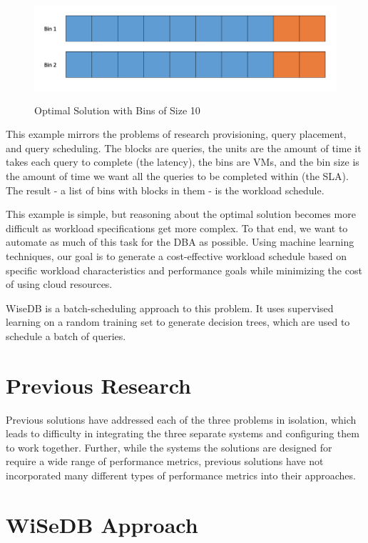 \documentclass{brandiss}
\numberwithin{section}{chapter}
\numberwithin{figure}{chapter}
\theoremstyle{definition}
\theoremstyle{plain}
\theoremstyle{remark}
\begin{document}
\begin{figure}[htbp]
  \centering
  \includegraphics[height=1.5in]{wisedb-example3}
  \caption{Optimal Solution with Bins of Size 10}
  \label{fig:wisedb-example3}
\end{figure}

This example mirrors the problems of research provisioning, query placement, and query scheduling. The blocks are queries, the units are the amount of time it takes each query to complete (the latency), the bins are VMs, and the bin size is the amount of time we want all the queries to be completed within (the SLA). The result - a list of bins with blocks in them - is the workload schedule.

This example is simple, but reasoning about the optimal solution becomes more difficult as workload specifications get more complex. To that end, we want to automate as much of this task for the DBA as possible. Using machine learning techniques, our goal is to generate a cost-effective workload schedule based on specific workload characteristics and performance goals while minimizing the cost of using cloud resources. 

WiseDB is a batch-scheduling approach to this problem. It uses supervised learning on a random training set to generate decision trees, which are used to schedule a batch of queries.


\section{Previous Research}

Previous solutions have addressed each of the three problems in isolation, which leads to difficulty in integrating the three separate systems and configuring them to work together. Further, while the systems the solutions are designed for require a wide range of performance metrics, previous solutions have not incorporated many different types of performance metrics into their approaches.

\section{WiSeDB Approach}
\end{document}
